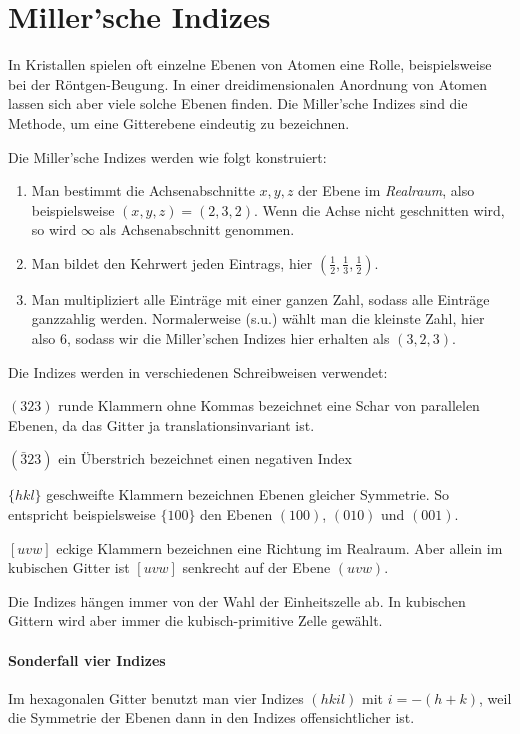 \section{Miller'sche Indizes}

In Kristallen spielen oft einzelne Ebenen von Atomen eine Rolle, beispielsweise bei der Röntgen-Beugung. In einer dreidimensionalen Anordnung von Atomen lassen sich aber viele solche Ebenen finden. Die Miller'sche Indizes sind die Methode, um eine Gitterebene eindeutig zu bezeichnen.

Die Miller'sche Indizes werden wie folgt konstruiert:
\begin{enumerate} \setlength{\itemsep}{0pt}
\item Man bestimmt die Achsenabschnitte $x,y,z$ der Ebene im \emph{Realraum}, also beispielsweise $(x,y,z) = (2,3,2)$. Wenn die Achse nicht geschnitten wird, so wird $\infty$ als Achsenabschnitt genommen.
\item Man bildet den Kehrwert jeden Eintrags, hier $(\frac{1}{2},\frac{1}{3}, \frac{1}{2})$.
\item  Man multipliziert alle Einträge mit einer ganzen Zahl, sodass alle Einträge ganzzahlig werden. Normalerweise (s.u.) wählt man die kleinste Zahl, hier also  $6$, sodass wir die Miller'schen Indizes hier erhalten als $(3,2,3)$.
\end{enumerate}
Die Indizes werden in verschiedenen Schreibweisen verwendet:
\begin{description} \setlength{\itemsep}{0pt}
\item $(323)$ runde Klammern ohne  Kommas bezeichnet eine  Schar von parallelen Ebenen, da das Gitter ja translationsinvariant ist.
\item $(\bar{3}23)$ ein Überstrich bezeichnet einen negativen Index
\item $\{hkl\}$ geschweifte Klammern bezeichnen Ebenen gleicher Symmetrie. So entspricht beispielsweise  $\{100\}$ den Ebenen $(100)$, $(010)$ und $(001)$.
\item $[uvw]$ eckige Klammern bezeichnen eine Richtung im Realraum. Aber allein im kubischen Gitter ist $[uvw]$ senkrecht auf der Ebene $(uvw)$.
\end{description}
Die Indizes hängen immer von der Wahl der Einheitszelle ab. In kubischen Gittern wird aber immer die kubisch-primitive Zelle gewählt.

\paragraph{Sonderfall vier Indizes} Im hexagonalen Gitter benutzt man vier Indizes $(hkil)$ mit $i = - (h + k)$, weil die Symmetrie der Ebenen  dann in den Indizes offensichtlicher ist.

